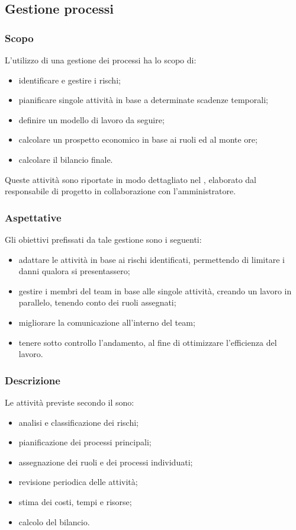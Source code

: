 \subsection{Gestione processi}

	\subsubsection{Scopo}
	L'utilizzo di una gestione dei processi ha lo scopo di:
	\begin{itemize}
		\item identificare e gestire i rischi;
		\item pianificare singole attività in base a determinate scadenze temporali;
		\item definire un modello di lavoro da seguire;
		\item calcolare un prospetto economico in base ai ruoli ed al monte ore;
		\item calcolare il bilancio finale.
	\end{itemize}
	Queste attività sono riportate in modo dettagliato nel , elaborato dal responsabile di progetto in collaborazione con l'amministratore.

	\subsubsection{Aspettative}
	Gli obiettivi prefissati da tale gestione sono i seguenti:
	\begin{itemize}
		\item adattare le attività in base ai rischi identificati, permettendo di limitare i danni qualora si presentassero;
		\item gestire i membri del team in base alle singole attività, creando un lavoro in parallelo, tenendo conto dei ruoli assegnati;
		\item migliorare la comunicazione all'interno del team;
		\item tenere sotto controllo l'andamento, al fine di ottimizzare l'efficienza del lavoro.
	\end{itemize}

	\subsubsection{Descrizione}
	Le attività previste secondo il  sono:
	\begin{itemize}
		\item analisi e classificazione dei rischi;
		\item pianificazione dei processi principali;
		\item assegnazione dei ruoli e dei processi individuati;
		\item revisione periodica delle attività;
		\item stima dei costi, tempi e risorse;
		\item calcolo del bilancio.
	\end{itemize}

